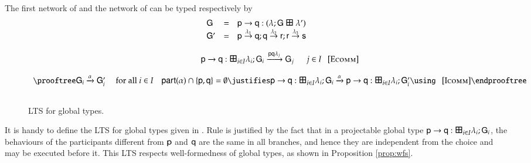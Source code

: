 \begin{example}
The  first network of    and the network of   
can be typed respectively by
\[
\begin{array}{lll}
\G&=&   \gtCom\pp\q{}:(\Seq\la\G~\GlSyB~\la') \\
\G'&=& \Seq{\Seq{\gtCom\pp\q{\la_1}}{\gtCom\q\pr{\la_2}}}{\gtCom\pr\ps{\la_3}}\\
\end{array}
\]
\end{example}
 


 

\begin{figure}
 \[
\begin{array}{c}
 \gt\pp\q i I \la \G \stackred{\Comm\pp{\la_j}\q}\G_j~~~~~~j\in I{~~~\rulename{Ecomm}}
 \\ \\
 \prooftree
 \G_i\stackred\alpha\G_i' \quad 
 \text{ for all }
i \in I \quad\participant{\alpha}\cap\set{\pp,\q}=\emptyset
 \justifies
 \gt\pp\q i I \la \G \stackred\alpha\gt\pp\q i I \la {\G'} 
 \using ~~~\rulename{Icomm}
  \endprooftree\\ \\
\end{array}
\]
\caption{
LTS for global types.
}
\end{figure}

It is handy to define the LTS for  global types
given in .  Rule  is justified by
the fact that in a projectable global type
$\gt\pp\q i I \la \G$, the behaviours of the participants different
from ${\sf p}$ and ${\sf q}$ are the same in all branches, and hence they are
independent from the choice and may be executed before it.  This LTS
respects well-formedness of global types,  as shown in Proposition
\ref{prop:wfs}.

